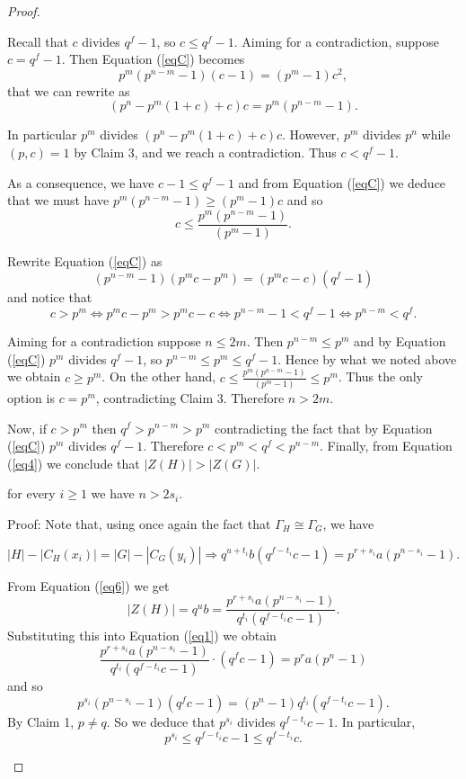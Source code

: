 \documentclass[10pt,a4paper]{amsart}
\begin{document}
\begin{proof}
\begin{description}
Recall that $c$ divides $q^f-1$, so $c \leq q^f-1$. Aiming for a contradiction, suppose $c=q^f-1$. Then Equation (\ref{eqC}) becomes
\[ p^{m}(p^{n-m}- 1)(c - 1)= (p^{m}- 1)c^2 , \]
that we can rewrite as
\[(p^n- p^m(1+c) +c)c = p^{m}(p^{n-m}- 1). \]

In particular $p^m$ divides $(p^n- p^m(1+c) +c)c $. However, $p^m$ divides $p^n$ while $(p,c)=1$ by Claim 3, and we reach a contradiction. Thus $c<q^f-1$.

As a consequence, we have $c-1 \leq q^f-1$ and from Equation (\ref{eqC}) we deduce that we must have $p^{m}(p^{n-m}- 1) \geq (p^{m}- 1)c$ and so 
\[c \leq \frac{p^{m}(p^{n-m}- 1)}{ (p^{m}- 1)}. \]

Rewrite Equation (\ref{eqC}) as
$$(p^{n-m}- 1)(p^mc - p^m)= (p^{m}c- c)(q^f - 1)$$
and notice that
$$c > p^m \Leftrightarrow p^mc - p^m > p^mc - c \Leftrightarrow p^{n-m}-1 < q^f-1
\Leftrightarrow p^{n-m} < q^f.$$  

Aiming for a contradiction suppose $n \leq 2m$. Then $p^{n-m} \leq p^m$ and by Equation (\ref{eqC}) $p^m$ divides $q^f-1$, so $p^{n-m} \leq p^m \leq q^f-1$.
Hence by what we noted above we obtain $c \geq p^m$. On the other hand, $c \leq \frac{p^{m}(p^{n-m}- 1)}{ (p^{m}- 1)} \leq p^m$. Thus the only option is $c=p^m$, contradicting Claim 3. Therefore $n > 2m$.

Now, if $c > p^m$ then $q^f > p^{n-m} > p^m$ contradicting the fact that by Equation (\ref{eqC}) $p^m$ divides $q^f-1$. Therefore $c < p^m < q^f < p^{n-m}$. Finally, from Equation (\ref{eq4}) we conclude that $|Z(H)| > |Z(G)|$.


\bigskip
\item[Claim 5] for every $i\geq 1$ we have $n > 2s_i$.

\smallskip
\noindent
Proof: 
Note that, using once again the fact that $\Gamma_H \cong \Gamma_G$, we have

\begin{equation}\label{eq6} |H| - |C_H(x_i)| = |G| - |C_G(y_i)| \Longrightarrow 
q^{u+t_i}b(q^{f-t_i}c - 1) = p^{r+s_i}a(p^{n-s_i} - 1). \end{equation}

From Equation (\ref{eq6}) we get
\[ |Z(H)| = q^ub = \frac{p^{r+s_i}a(p^{n-s_i}- 1)}{q^{t_i}(q^{f-t_i}c - 1)}.\]
Substituting this into Equation (\ref{eq1}) we obtain
\[ \frac{p^{r+s_i}a(p^{n-s_i}- 1)}{q^{t_i}(q^{f-t_i}c - 1)}\cdot (q^fc - 1)= p^{r}a(p^{n}- 1) \]
and so 
\[ p^{s_i}(p^{n-s_i}- 1)(q^fc - 1) = (p^{n}- 1)q^{t_i}(q^{f-t_i}c - 1). \]
By Claim 1, $p\neq q$. So we deduce that $p^{s_i}$ divides $q^{f-t_i}c - 1$. In particular, 
\begin{equation}\label{last}
p^{s_i} \leq q^{f-t_i}c - 1 \leq q^{f-t_i}c.
\end{equation}


\end{description}
\end{proof}
\end{document}
